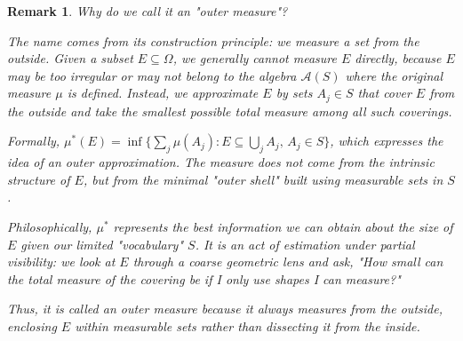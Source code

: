 \documentclass[12pt]{article}
\theoremstyle{blueplain}
\theoremstyle{bluedef}
\theoremstyle{blueremark}
\newtheorem{remark}{Remark}[section]
\numberwithin{equation}{section}
\begin{document}
\begin{remark}
  Why do we call it an "outer measure"?

  The name comes from its construction principle: we measure a set \emph{from the outside}. Given a subset $E \subseteq \Omega$, we generally cannot measure $E$ directly, because $E$ may be too irregular or may not belong to the algebra $\mathcal{A}(S)$ where the original measure $\mu$ is defined. Instead, we approximate $E$ by sets $A_j \in S$ that cover $E$ from the outside and take the smallest possible total measure among all such coverings.

  Formally, $\mu^*(E) = \inf\{\sum_j \mu(A_j) : E \subseteq \bigcup_j A_j,\, A_j \in S\}$, which expresses the idea of an \emph{outer approximation}. The measure does not come from the intrinsic structure of $E$, but from the minimal "outer shell" built using measurable sets in $S$.

  Philosophically, $\mu^*$ represents the best information we can obtain about the size of $E$ given our limited "vocabulary" $S$. It is an act of estimation under partial visibility: we look at $E$ through a coarse geometric lens and ask, "How small can the total measure of the covering be if I only use shapes I can measure?"

  Thus, it is called an \emph{outer measure} because it always measures from the \emph{outside}, enclosing $E$ within measurable sets rather than dissecting it from the inside.
\end{remark}
\end{document}
